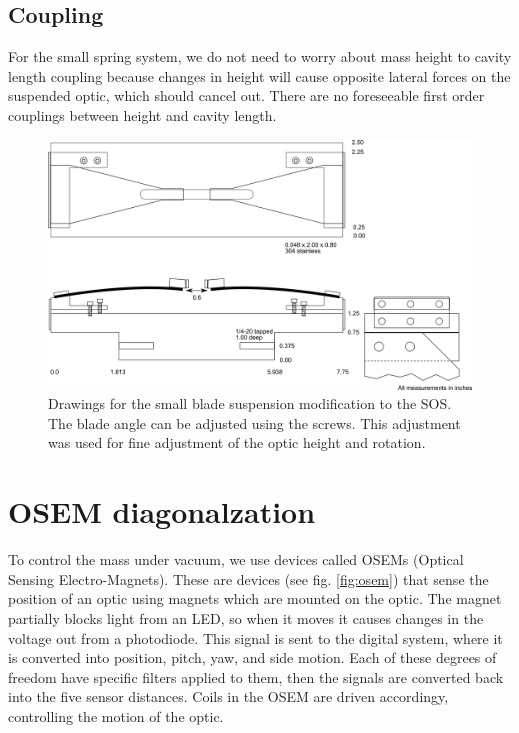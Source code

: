 \subsection{Coupling}
For the small spring system, we do not need to worry about mass height to cavity length coupling because changes in height will cause opposite lateral forces on the suspended optic, which should cancel out. There are no foreseeable first order couplings between height and cavity length.



\begin{figure}[p]
	\centering
		\includegraphics[width=\textwidth, angle=90]{figures/suspensions/bb1.png}
	\caption[Small blade design]{Drawings for the small blade suspension modification to the SOS. The blade angle can be adjusted using the screws. This adjustment was used for fine adjustment of the optic height and rotation.}
	\label{fig:babyschematic}
\end{figure}
\section{OSEM diagonalzation}

To control the mass under vacuum, we use devices called OSEMs (Optical Sensing Electro-Magnets). These are devices (see fig. \ref{fig:osem}) that sense the position of an optic using magnets which are mounted on the optic. The magnet partially blocks light from an LED, so when it moves it causes changes in the voltage out from a photodiode. This signal is sent to the digital system, where it is converted into position, pitch, yaw, and side motion. Each of these degrees of freedom have specific filters applied to them, then the signals are converted back into the five sensor distances. Coils in the OSEM are driven accordingy, controlling the motion of the optic.

